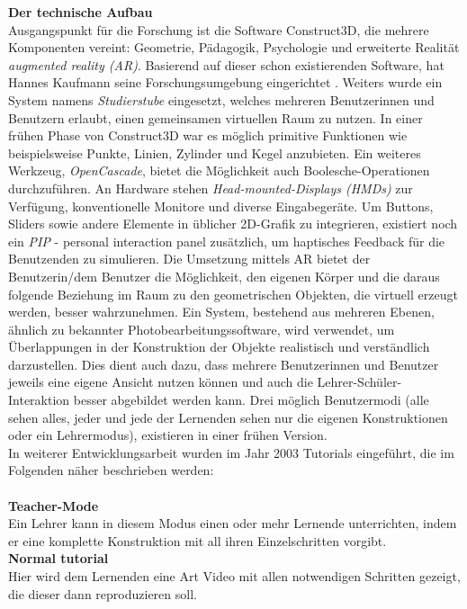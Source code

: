 \documentclass[deutsch]{llncs}
\begin{document}
\textbf{Der technische Aufbau} \\
Ausgangspunkt für die Forschung ist die Software Construct3D, die mehrere Komponenten vereint: Geometrie, Pädagogik, Psychologie und erweiterte Realität \emph{augmented reality (AR)}.
Basierend auf dieser schon existierenden Software, hat Hannes Kaufmann seine Forschungsumgebung eingerichtet \cite{Kaufmann:2002:MGE:1242073.1242086}. 
Weiters wurde ein System namens \emph{Studierstube} eingesetzt, welches mehreren Benutzerinnen und Benutzern erlaubt, einen gemeinsamen virtuellen Raum zu nutzen.
In einer frühen Phase von Construct3D war es möglich primitive Funktionen wie beispielsweise Punkte, Linien, Zylinder und Kegel anzubieten.
Ein weiteres Werkzeug, \emph{OpenCascade}, bietet die Möglichkeit auch Boolesche-Operationen durchzuführen.
An Hardware stehen \emph{Head-mounted-Displays (HMDs)} zur 
Verfügung, konventionelle Monitore und diverse Eingabegeräte. Um Buttons, Sliders sowie andere Elemente in üblicher 2D-Grafik zu integrieren, existiert noch ein \emph{PIP} - personal interaction panel zusätzlich, um haptisches Feedback für die Benutzenden zu simulieren. 
Die Umsetzung mittels AR bietet der Benutzerin/dem Benutzer die Möglichkeit, den eigenen Körper und die daraus folgende Beziehung im Raum zu den geometrischen Objekten, die virtuell erzeugt werden,
besser wahrzunehmen. 
Ein System, bestehend aus mehreren Ebenen, ähnlich zu bekannter Photobearbeitungssoftware, wird verwendet, um Überlappungen in der Konstruktion der Objekte realistisch und verständlich darzustellen. Dies dient auch dazu, dass mehrere Benutzerinnen und Benutzer jeweils eine eigene Ansicht nutzen können und auch die Lehrer-Schüler-Interaktion besser abgebildet werden kann. 
Drei möglich Benutzermodi (alle sehen alles, jeder und jede der Lernenden sehen nur die eigenen Konstruktionen oder ein Lehrermodus), existieren in einer frühen Version. \\
In weiterer Entwicklungsarbeit wurden im Jahr 2003 Tutorials eingeführt, die im Folgenden näher beschrieben werden: \\
\noindent \\
\textbf{Teacher-Mode}  \\
Ein Lehrer kann in diesem Modus einen oder mehr Lernende unterrichten, indem er eine komplette Konstruktion mit all ihren Einzelschritten vorgibt. \\
\textbf{Normal tutorial}\\
Hier wird dem Lernenden eine Art Video mit allen notwendigen Schritten gezeigt, die dieser dann reproduzieren soll. \\
\end{document}
